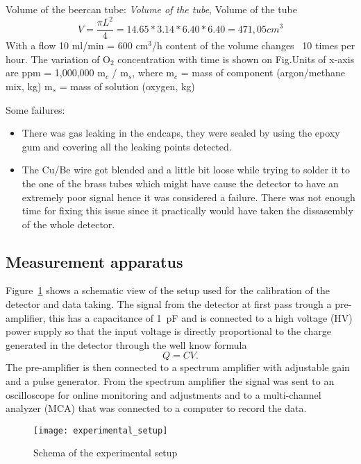 Volume of the beercan tube:
\emph{Volume of the tube}, Volume of the tube
\begin{equation}
  \label{eq:tube_volume}
  V=\frac{\pi L^2}{4} =14.65*3.14*6.40*6.40=471,05 cm^3
\end{equation}
With a flow 10 ml/min = 600 cm$^3$/h content of the volume changes ~10 times per
hour.  The variation of O$_{2}$ concentration with time is shown on Fig.Units of
x-axis are ppm = 1,000,000 m$_{c}$ / m$_{s}$, where m$_{c}$ = mass of component
(argon/methane mix, kg) m$_{s}$ = mass of solution (oxygen, kg)

Some failures:
\begin{itemize}
\item There was gas leaking in the endcaps, they were sealed by using the epoxy
  gum and covering all the leaking points detected.
  \item The Cu/Be wire got blended and a little bit loose while trying to solder
    it to the one of the brass tubes which might have cause the detector to have
    an extremely poor signal hence it was considered a failure. There was not
    enough time for fixing this issue since it practically would have taken the
    dissasembly of the whole detector.
\end{itemize}

\subsection{Measurement apparatus}
\label{sec:meas-appar}
Figure~\ref{fig:exp_setup} shows a schematic view of the setup used for the
calibration of the detector and data taking. The signal from the detector at
first pass trough a pre-amplifier, this has a capacitance of 1~pF and is
connected to a high voltage (HV) power supply so that the input voltage is
directly proportional to the charge generated in the detector through the well
know formula\autocite{Knoll:RadMeasurement}
\begin{equation}
  \label{eq:capacitance}
  Q = CV.
\end{equation}
The pre-amplifier is then connected to a spectrum amplifier with adjustable gain
and a pulse generator. From the spectrum amplifier the signal was sent to an
oscilloscope for online monitoring and adjustments and to a multi-channel
analyzer (MCA) that was connected to a computer to record the data.
\begin{figure}[!h]
  \centering
  \texttt{[image: experimental\_setup]}
  \caption{Schema of the experimental setup}
  \label{fig:exp_setup}
\end{figure}
